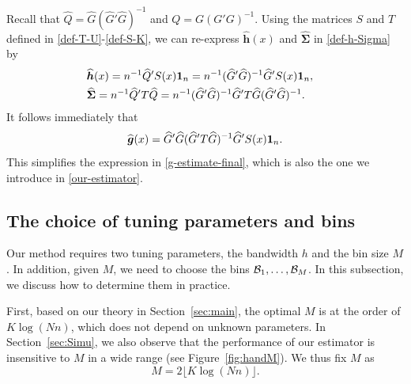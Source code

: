 \documentclass[preprint,11pt]{article}
\newcommand{\bh}{{\boldsymbol h}}
\newcommand{\bdSigma}{{\boldsymbol \Sigma}}
\numberwithin{equation}{section}
\newcommand{\beq}{\begin{equation}}
\newcommand{\eeq}{\end{equation}}
\begin{document}
Recall that 
$\widehat{Q}=  \widehat{G}(\widehat{G}'\widehat{G})^{-1}$ and $Q = G(G'G)^{-1}$. 
Using the matrices $S$ and $T$ defined in \eqref{def-T-U}-\eqref{def-S-K}, we can re-express $\widehat{\bh}(x)$ and $\widehat{\bdSigma}$ in \eqref{def-h-Sigma} by
\begin{align} \label{h-Sigma-matrix-form}
& \widehat{\boldsymbol h}(x) = n^{-1}\widehat{Q}'S(x) {\bf 1}_n = n^{-1} (\widehat{G}'\widehat{G})^{-1}\widehat{G}'S(x) {\bf 1}_n,\cr
& \widehat{\boldsymbol \Sigma} = n^{-1}\widehat{Q}'T\widehat{Q} = n^{-1} (\widehat{G}'\widehat{G})^{-1} \widehat{G}'T\widehat{G}(\widehat{G}'\widehat{G})^{-1}.
\end{align}
It follows immediately that 
\beq \label{our-estimator-repeat}
\widehat{\boldsymbol g}(x) = \widehat{G}'\widehat{G}(\widehat{G}'T\widehat{G})^{-1}\widehat{G}'S(x) {\bf 1}_n. 
\eeq
This simplifies the expression in \eqref{g-estimate-final}, which is also the one we introduce in \eqref{our-estimator}.


\subsection{The choice of tuning parameters and bins}  \label{subsec:tuning}

Our method requires two tuning parameters, the bandwidth $h$ and the bin size $M$. In addition, given $M$, we need to choose the bins ${\cal B}_1, \ldots, {\cal B}_M$. 
In this subsection, we discuss how to determine them in practice. 


First, based on our theory in Section~\ref{sec:main}, the optimal  $M$ is at the order of $K\log(Nn)$, which does not depend on unknown parameters. In Section~\ref{sec:Simu}, we also observe that the performance of our estimator is insensitive to $M$ in a wide range (see Figure~\ref{fig:handM}). 
We thus fix $M$ as
\beq \label{chooseM}
M = 2 \lfloor K\log(Nn)\rfloor. 
\eeq
\end{document}
